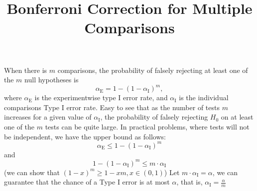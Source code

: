 \documentclass[12pt]{article}
\title{Bonferroni Correction for Multiple Comparisons}
\begin{document}
\maketitle



When there is $m$ comparisons, the probability of falsely rejecting at least one of the $m$ null hypotheses is $$\alpha_{\mbox{E}} = 1-(1-\alpha_{\mbox{I}})^{m},$$
where $\alpha_{\mbox{E}}$ is the experimentwise type I error rate, and $\alpha_{\mbox{I}}$ is the individual comparisons Type I error rate.
Easy to see that as the number of tests $m$ increases for a given value of $\alpha_{\mbox{I}}$, the probability of falsely rejecting $H_0$ on at least one of the $m$ tests can be quite large. 
In practical problems, where tests will not be independent, we have the upper bound as follows:
 $$\alpha_{\mbox{E}} \le 1-(1-\alpha_{\mbox{I}})^{m}$$
and 
$$1-(1-\alpha_{\mbox{I}})^{m}\le m\cdot \alpha_{\mbox{I}}$$
(we can show that $(1-x)^m\ge1-xm, x\in(0,1)$)
Let $m\cdot \alpha_{\mbox{I}}=\alpha$, we can guarantee that the chance of a Type I error is at most $\alpha$, that is, $\alpha_{\mbox{I}}=\frac{\alpha}{m}$
\end{document}
